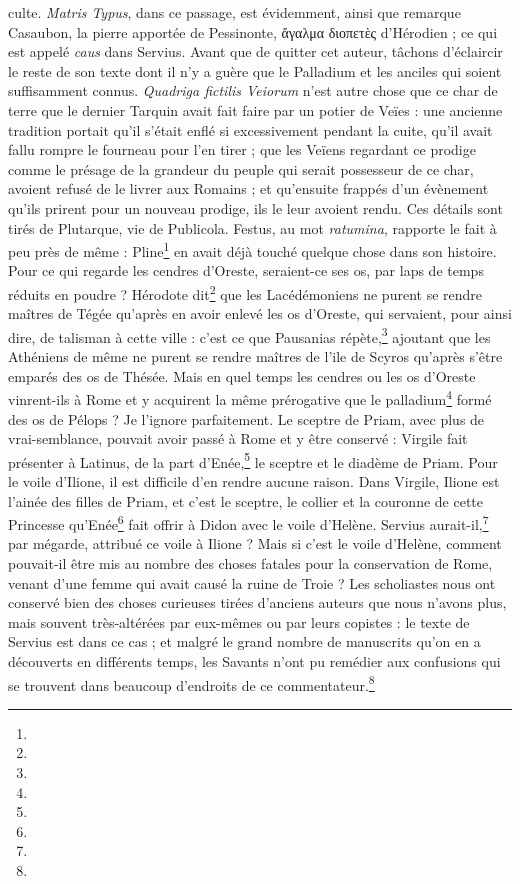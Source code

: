 \documentclass[a4paper, 11pt, oneside, polutonikogreek, french]{article}
\begin{document}
culte. \emph{Matris Typus}, dans ce passage, est évidemment, ainsi que remarque Casaubon, la pierre apportée de Pessinonte, ἄγαλμα διοπετὲς d'Hérodien ; ce qui est appelé \emph{caus} dans Servius. Avant que de quitter cet auteur, tâchons d'éclaircir le reste de son texte dont il n'y a guère que le Palladium et les anciles qui soient suffisamment connus. \emph{Quadriga fictilis Veiorum} n'est autre chose que ce char de terre que le dernier Tarquin avait fait faire par un potier de Veïes : une ancienne tradition portait qu'il s'était enflé si excessivement pendant la cuite, qu'il avait fallu rompre le fourneau pour l'en tirer ; que les Veïens regardant ce prodige comme le présage de la grandeur du peuple qui serait possesseur de ce char, avoient refusé de le livrer aux Romains ; et qu'ensuite frappés d'un évènement qu'ils prirent pour un nouveau prodige, ils le leur avoient rendu. Ces détails sont tirés de Plutarque, vie de Publicola. Festus, au mot \emph{ratumina}, rapporte le fait à peu près de même : Pline\footnote{} en avait déjà touché quelque chose dans son histoire. Pour ce qui regarde les cendres d'Oreste, seraient-ce ses os, par laps de temps réduits en poudre ? Hérodote dit\footnote{} que les Lacédémoniens ne purent se rendre maîtres de Tégée qu'après en avoir enlevé les os d'Oreste, qui servaient, pour ainsi dire, de talisman à cette ville : c'est ce que Pausanias répète,\footnote{} ajoutant que les Athéniens de même ne purent se rendre maîtres de l'ile de Scyros qu'après s'être emparés des os de Thésée. Mais en quel temps les cendres ou les os d'Oreste vinrent-ils à Rome et y acquirent la même prérogative que le palladium\footnote{} formé des os de Pélops ? Je l'ignore parfaitement. Le sceptre de Priam, avec plus de vrai-semblance, pouvait avoir passé à Rome et y être conservé : Virgile fait présenter à Latinus, de la part d'Enée,\footnote{} le sceptre et le diadème de Priam. Pour le voile d'Ilione, il est difficile d'en rendre aucune raison. Dans Virgile, Ilione est l'ainée des filles de Priam, et c'est le sceptre, le collier et la couronne de cette Princesse qu'Enée\footnote{} fait offrir à Didon avec le voile d'Helène. Servius aurait-il,\footnote{} par mégarde, attribué ce voile à Ilione ? Mais si c'est le voile d'Helène, comment pouvait-il être mis au nombre des choses fatales pour la conservation de Rome, venant d'une femme qui avait causé la ruine de Troie ? Les scholiastes nous ont conservé bien des choses curieuses tirées d'anciens auteurs que nous n'avons plus, mais souvent très-altérées par eux-mêmes ou par leurs copistes : le texte de Servius est dans ce cas ; et malgré le grand nombre de manuscrits qu'on en a découverts en différents temps, les Savants n'ont pu remédier aux confusions qui se trouvent dans beaucoup d'endroits de ce commentateur.\footnote{}
\end{document}

